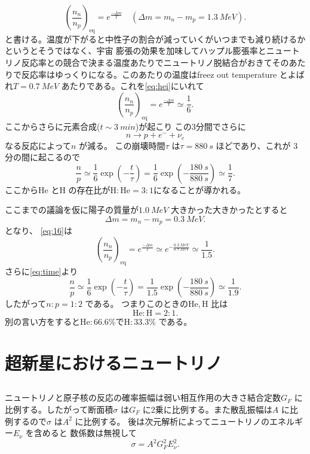 \documentclass[dvipdfmx]{jsarticle}
\begin{document}
\begin{equation}
\label{eq:hei}
	\left( \frac{n_n}{n_p} \right)_\text{eq}  =e^{ \frac{-\Delta m}{T}} \quad(\Delta m=m_n-m_p=\SI{1.3}{MeV})
.\end{equation}
と書ける。温度が下がると中性子の割合が減っていくがいつまでも減り続けるかというとそうではなく、宇宙
膨張の効果を加味してハップル膨張率とニュートリノ反応率との競合で決まる温度あたりでニュートリノ脱結合がおきてそのあたりで反応率はゆっくりになる。このあたりの温度はfreez out temperature とよばれ$T=\SI{0.7}{MeV}$ あたりである\cite{5}。これを\eqref{eq:hei}にいれて
	\begin{equation}
	\label{eq:16}
	\left( \frac{n_n}{n_p} \right)_\text{eq}  =e^{ \frac{-\Delta m}{T}} \simeq \frac{1}{6}
	.\end{equation}
ここからさらに元素合成($t\sim \SI{3}{min}$)が起こり
この3分間でさらに
\[
	n\to p+e^{-}+\nu_e
\] 
なる反応によって$n$ が減る。
この崩壊時間$\tau$ は$\tau=\SI{880}{s}$\cite{5} ほどであり、これが
3分の間に起こるので
\begin{equation}
\label{eq:time}
\frac{n}{p}\simeq \frac{1}{6}\exp (-\frac{t}{\tau})=\frac{1}{6}\exp \left( -\frac{\SI{180}{s}}{\SI{880}{s}} \right) \simeq \frac{1}{7}
.\end{equation}
ここから$\mathrm{He}$ と$\mathrm{H}$ の存在比が$\mathrm{H}:\mathrm{He}=3:1$になることが導かれる。

ここまでの議論を仮に陽子の質量が$\SI{1.0}{MeV}$ 大きかった大きかったとすると
\[
\Delta m= m_n-m_p=\SI{0.3}{MeV}
.\] 
となり、
\eqref{eq:16}は
\begin{equation}
\label{eq:16kai}
	\left( \frac{n_n}{n_p} \right)_\text{eq}  =e^{ \frac{-\Delta m}{T}} \simeq e^{ -\frac{\SI{0.3}{MeV}}{\SI{0.7}{MeV}}} \simeq \frac{1}{1.5}
.\end{equation}
さらに\eqref{eq:time}より
\begin{equation}
\label{eq:timekai}
\frac{n}{p}\simeq \frac{1}{6}\exp (-\frac{t}{\tau})=\frac{1}{1.5}\exp \left( -\frac{\SI{180}{s}}{\SI{880}{s}} \right) \simeq \frac{1}{1.9}
.\end{equation}
したがって$n:p=1:2$ である。
つまりこのときの$\mathrm{He},\mathrm{H}$ 比は
\[
\mathrm{He}:\mathrm{H}=2:1
.\] 
別の言い方をすると$\mathrm{He}:66.6\%$で$\mathrm{H}:33.3\%$ である。
\section{超新星におけるニュートリノ}
\subsection{}\label{4-1}
ニュートリノと原子核の反応の確率振幅は弱い相互作用の大きさ結合定数$G_F$ に比例する。したがって断面積$\sigma$ は$G_F$ に2乗に比例する。また散乱振幅は$A$ に比例するので$\sigma$ は$A^2$ に比例する。
後は次元解析によってニュートリノのエネルギー$E_\nu$ を含めると
数係数は無視して
\[
\sigma=A^2G_F^2E_\nu^2
.\] 
\end{document}
